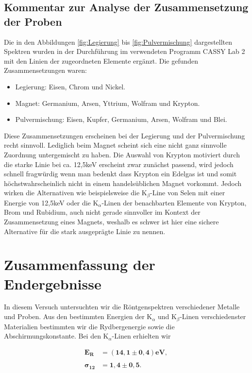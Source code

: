 \documentclass{article}
\begin{document}
\subsection{Kommentar zur Analyse der Zusammensetzung der Proben}

Die in den Abbildungen \ref{fig:Legierung} bis \ref{fig:Pulvermischung} dargestellten Spektren wurden in der Durchführung im verwendeten Programm CASSY Lab 2 mit den Linien der zugeordneten Elemente ergänzt. Die gefunden Zusammensetzungen waren:

\begin{itemize}
  \item Legierung: Eisen, Chrom und Nickel.
  \item Magnet: Germanium, Arsen, Yttrium, Wolfram und Krypton.
  \item Pulvermischung: Eisen, Kupfer, Germanium, Arsen, Wolfram und Blei.
\end{itemize}

Diese Zusammensetzungen erscheinen bei der Legierung und der Pulvermischung recht sinnvoll. Lediglich beim Magnet scheint sich eine nicht ganz sinnvolle Zuordnung untergemischt zu haben. Die Auswahl von Krypton motiviert durch die starke Linie bei ca. 12,5keV erscheint zwar zunächst passend, wird jedoch schnell fragwürdig wenn man bedenkt dass Krypton ein Edelgas ist und somit höchstwahrscheinlich nicht in einem handelsüblichen Magnet vorkommt. Jedoch wirken die Alternativen wie beispielsweise die K$_\beta$-Line von Selen mit einer Energie von 12,5keV oder die K$_\alpha$-Linen der benachbarten Elemente von Krypton, Brom und Rubidium, auch nicht gerade sinnvoller im Kontext der Zusammensetzung eines Magnets, weshalb es schwer ist hier eine sichere Alternative für die stark ausgeprägte Linie zu nennen.




\newpage
\section{Zusammenfassung der Endergebnisse}

In diesem Versuch untersuchten wir die Röntgenspektren verschiedener Metalle und Proben. Aus den bestimmten Energien der K$_\alpha$ und K$_\beta$-Linen verschiedenster Materialien bestimmten wir die Rydbergenergie sowie die Abschirmungskonstante. Bei den K$_\alpha$-Linen erhielten wir

\begin{equation}
    \begin{split}
        \bm{E_R} &\bm{= (14,1 \pm 0,4)} \textbf{eV}, \\ \\
        \bm{\sigma_{12}} &\bm{= 1,4 \pm 0,5}.
    \end{split}
\end{equation}
\end{document}
